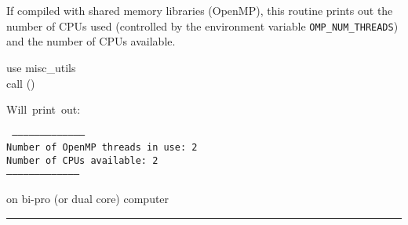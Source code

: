 
\sloppy


\section[brag\_openmp]{ }
\label{sub:brag_openmp}
\author{Eric Hivon}

\begin{facility}
{If compiled with shared memory libraries (OpenMP), this routine prints out the number of
CPUs used (controlled by the environment variable {\tt OMP\_NUM\_THREADS}) and the number of CPUs available.}
{\modMiscUtils}
\end{facility}

\begin{f90format}
{}
\end{f90format}


\begin{example}
{
use misc\_utils \\
call \thedocid() \\
}
{
\parbox[t]{8.2cm}{
Will~print~out: \hfill\\
\parbox[t]{8cm}{\tt
-------------------------------------- \\
Number of OpenMP threads in use:    2 \\
Number of CPUs available:           2 \\
-------------------------------------- }
on bi-pro (or dual core) computer}
}
\end{example}



\rule{\hsize}{2mm}

\newpage
